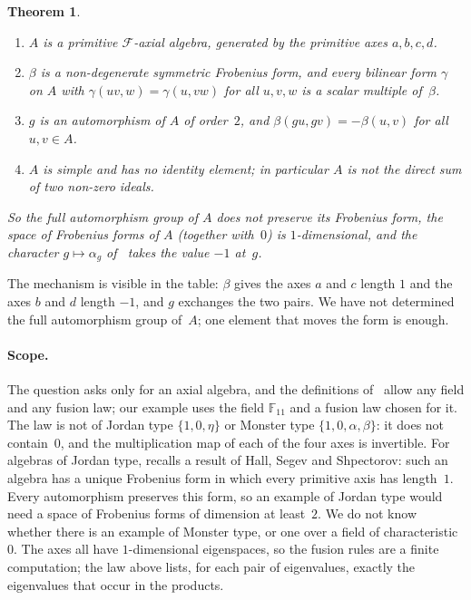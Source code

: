 \documentclass[11pt]{article}
\newtheorem{theorem}{Theorem}
\theoremstyle{remark}
\newcommand{\F}{\mathbb{F}}
\begin{document}
\begin{theorem}\label{thm:main}
\begin{enumerate}
\item[(a)] $A$ is a primitive $\mathcal F$-axial algebra, generated by the
primitive axes $a,b,c,d$.
\item[(b)] $\beta$ is a non-degenerate symmetric Frobenius form, and every
bilinear form $\gamma$ on $A$ with $\gamma(uv,w)=\gamma(u,vw)$ for all $u,v,w$
is a scalar multiple of~$\beta$.
\item[(c)] $g$ is an automorphism of $A$ of order~$2$, and
$\beta(gu,gv)=-\beta(u,v)$ for all $u,v\in A$.
\item[(d)] $A$ is simple and has no identity element; in particular $A$ is not
the direct sum of two non-zero ideals.
\end{enumerate}
So the full automorphism group of $A$ does not preserve its Frobenius form, the
space of Frobenius forms of $A$ (together with~$0$) is $1$-dimensional, and the
character $g\mapsto\alpha_g$ of~\cite{gs} takes the value $-1$ at~$g$.
\end{theorem}

The mechanism is visible in the table: $\beta$ gives the axes $a$ and $c$ length
$1$ and the axes $b$ and $d$ length $-1$, and $g$ exchanges the two pairs. We
have not determined the full automorphism group of~$A$; one element that moves
the form is enough.

\paragraph{Scope.}
The question asks only for an axial algebra, and the definitions
of~\cite{gs} allow any field and any fusion law; our example uses the field
$\F_{11}$ and a fusion law chosen for it. The law is not of Jordan type
$\{1,0,\eta\}$ or Monster type $\{1,0,\alpha,\beta\}$: it does not contain~$0$,
and the multiplication map of each of the four axes is invertible. For
algebras of Jordan type, \cite{gs} recalls a result of Hall, Segev and
Shpectorov: such an algebra has a unique Frobenius form in which every
primitive axis has length~$1$. Every automorphism preserves this form, so an
example of Jordan type would need a space of Frobenius forms of dimension at
least~$2$. We do not know whether there is an example of Monster type, or one
over a field of characteristic~$0$. The axes all have $1$-dimensional eigenspaces, so the fusion rules are a
finite computation; the law above lists, for each pair of eigenvalues, exactly
the eigenvalues that occur in the products.
\end{document}
